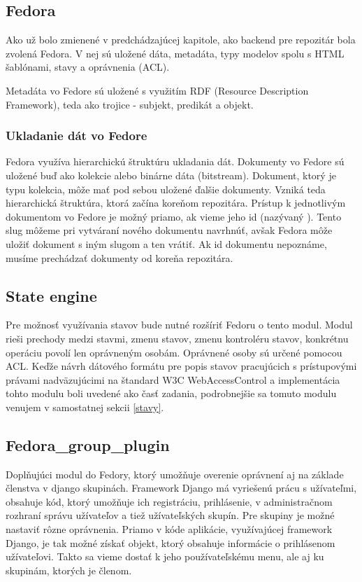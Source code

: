 \documentclass[thesis=M,slovak]{FITthesis}[2013/05/06]
\begin{document}
\subsection{Fedora}
Ako už bolo zmienené v predchádzajúcej kapitole, ako backend pre repozitár bola zvolená Fedora. V nej sú uložené dáta, metadáta, typy modelov spolu s HTML šablónami, stavy a oprávnenia (ACL).

Metadáta vo Fedore sú uložené s využitím RDF (Resource Description Framework), teda ako trojice - subjekt, predikát a objekt.

\subsubsection{Ukladanie dát vo Fedore}
\label{UkladanieDatFedora}Fedora využíva hierarchickú štruktúru ukladania dát. Dokumenty vo Fedore sú uložené buď ako kolekcie alebo binárne dáta (bitstream). Dokument, ktorý je typu kolekcia, môže mať pod sebou uložené ďalšie dokumenty. Vzniká teda hierarchická štruktúra, ktorá začína koreňom repozitára. Prístup k jednotlivým dokumentom vo Fedore je možný priamo, ak vieme jeho id (nazývaný ). Tento slug môžeme pri vytváraní nového dokumentu navrhnúť, avšak Fedora môže uložiť dokument s iným slugom a ten vrátiť. Ak id dokumentu nepoznáme, musíme prechádzať dokumenty od koreňa repozitára.

\subsection{State engine}
Pre možnosť využívania stavov bude nutné rozšíriť Fedoru o tento modul. Modul rieši prechody medzi stavmi, zmenu stavov, zmenu kontroléru stavov, konkrétnu operáciu povolí len oprávneným osobám. Oprávnené osoby sú určené pomocou ACL. Keďže návrh dátového formátu pre popis stavov pracujúcich s prístupovými právami nadväzujúcimi na štandard W3C WebAccessControl a implementácia tohto modulu boli uvedené ako časť zadania, podrobnejšie sa tomuto modulu venujem v samostatnej sekcii \ref{stavy}.

\subsection{Fedora\_group\_plugin}
Doplňujúci modul do Fedory, ktorý umožňuje overenie oprávnení aj na základe členstva v django skupinách. Framework Django má vyriešenú prácu s užívateľmi, obsahuje kód, ktorý umožňuje ich registráciu, prihlásenie, v administračnom rozhraní správu užívateľov a tiež užívateľských skupín. Pre skupiny je možné nastaviť rôzne oprávnenia. Priamo v kóde aplikácie, využívajúcej framework Django, je tak možné získať objekt, ktorý obsahuje informácie o prihlásenom užívateľovi. Takto sa vieme dostať k jeho používateľskému menu, ale aj ku skupinám, ktorých je členom. 
\end{document}
